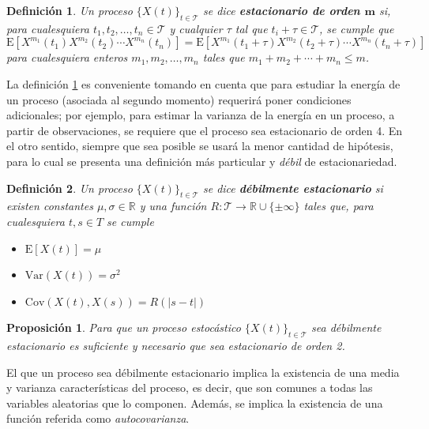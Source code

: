 \documentclass[12pt,letterpaper]{book}
\newtheorem{definicion}{Definición}[chapter]
\newtheorem{proposicion}[teorema]{Proposición}
\newcommand{\R}{\mathbb{R}}
\newcommand{\E}[1]{\mathrm{E}\left[ #1 \right]}
\newcommand{\Var}[1]{\mathrm{Var}\left( #1 \right)}
\newcommand{\Cov}[1]{\mathrm{Cov}\left( #1 \right)}
\newcommand{\abso}[1]{\left| #1 \right|}
\newcommand{\xt}{$\{X(t)\}_{t\in \mathcal{T}}$ }
\begin{document}
\begin{definicion}%
Un proceso \xt se dice \textbf{estacionario de orden $\boldsymbol{m}$} si, para cualesquiera $t_1, t_2, \dots, t_n \in \mathcal{T}$ y cualquier $\tau$ tal que $t_i + \tau \in \mathcal{T}$, se cumple que
\begin{equation*}
\E{X^{m_1}(t_1)X^{m_2}(t_2)\cdots X^{m_n}(t_n)} =
\E{X^{m_1}(t_1+\tau)X^{m_2}(t_2+\tau)\cdots X^{m_n}(t_n+\tau)}
\end{equation*}
para cualesquiera enteros $m_1, m_2, \dots, m_n$ tales que $m_1+m_2+\cdots+m_n \leq m$.
\label{est_m}
\end{definicion}

La definición \ref{est_m} es conveniente tomando en cuenta que para estudiar la energía de un proceso (asociada al segundo momento) requerirá poner condiciones adicionales; por ejemplo, para estimar la varianza de la energía en un proceso, a partir de observaciones, se requiere que el proceso sea estacionario de orden 4.
%
En el otro sentido, siempre que sea posible se usará la menor cantidad de hipótesis, para lo cual se presenta una definición más particular y \textit{débil} de estacionariedad.

\begin{definicion}%
Un proceso \xt se dice \textbf{débilmente estacionario} si existen constantes $\mu, \sigma \in \R$ y una función $R : \mathcal{T} \rightarrow \R \cup \{ \pm \infty \} $ tales que, para cualesquiera $t, s \in T$ se 
cumple
\begin{itemize}
\item $\E{X(t)} = \mu$
\item $\Var{X(t)} = \sigma^{2}$
\item $\Cov{X(t),X(s)} = R(\abso{s-t})$
\end{itemize}
\end{definicion}

\begin{proposicion}
Para que un proceso estocástico \xt sea débilmente estacionario es suficiente y necesario que sea estacionario de orden 2.
\end{proposicion}

El que un proceso sea débilmente estacionario implica la existencia de una media y varianza características del proceso, es decir, que son comunes a todas las variables aleatorias que lo componen. 
%
Además, se implica la existencia de una función referida como \textit{autocovarianza}.
\end{document}
